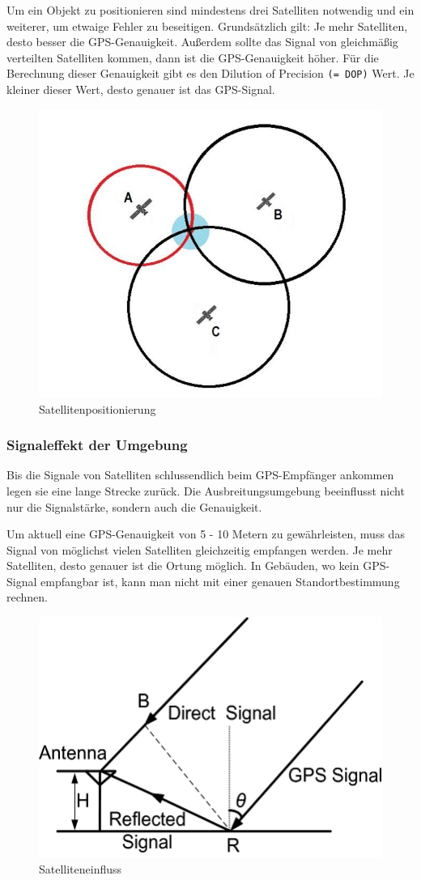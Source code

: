 Um ein Objekt zu positionieren sind mindestens drei Satelliten notwendig und ein weiterer, um etwaige Fehler zu beseitigen. Grundsätzlich gilt: Je mehr Satelliten, desto besser die GPS-Genauigkeit. Außerdem sollte das Signal von gleichmäßig verteilten Satelliten kommen, dann ist die GPS-Genauigkeit höher. Für die Berechnung dieser Genauigkeit gibt es den Dilution of Precision \texttt{(= DOP)} Wert.  Je kleiner dieser Wert, desto genauer ist das GPS-Signal.
\begin{figure}[H]
	\centering
	\includegraphics[width=0.7\linewidth]{images/Satellitenposition.jpg}
	\caption[Satellitenpositionierung]{Satellitenpositionierung}
	\label{fig:Satellitenposition}
\end{figure}

\newpage
\subsubsection{Signaleffekt der Umgebung}


Bis die Signale von Satelliten schlussendlich beim GPS-Empfänger ankommen legen sie eine lange Strecke zurück. Die Ausbreitungsumgebung beeinflusst nicht nur die Signalstärke, sondern auch die Genauigkeit.

Um aktuell eine GPS-Genauigkeit von 5 - 10 Metern zu gewährleisten, muss das Signal von möglichst vielen Satelliten gleichzeitig empfangen werden. Je mehr Satelliten, desto genauer ist die Ortung möglich. In Gebäuden, wo kein GPS-Signal empfangbar ist, kann man nicht mit einer genauen Standortbestimmung rechnen. \parencite{GPSGenauigkeit}

\begin{figure}[H]
	\centering
	\includegraphics[width=0.7\linewidth]{images/Satelliteneinfluss.jpg}
	\caption[Satelliteneinfluss]{Satelliteneinfluss}
	\label{fig:Satelliteneinfluss}
\end{figure}

